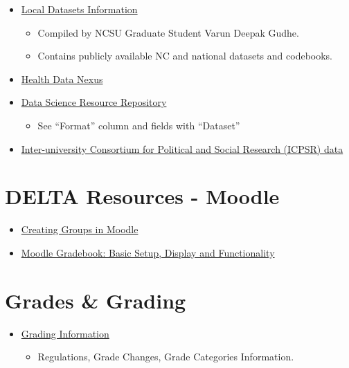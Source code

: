 \documentclass[
  letterpaper,
  DIV=11,
  numbers=noendperiod]{scrreprt}
\providecommand{\tightlist}{%
  \setlength{\itemsep}{0pt}\setlength{\parskip}{0pt}}
\begin{document}
\begin{itemize}
\tightlist
\item
  \href{https://github.com/varundeepakgudhe/Data_Science_Academy}{Local
  Datasets Information}

  \begin{itemize}
  \tightlist
  \item
    Compiled by NCSU Graduate Student Varun Deepak Gudhe.
  \item
    Contains publicly available NC and national datasets and codebooks.
  \end{itemize}
\item
  \href{https://healthdatanexus.ai/content/}{Health Data Nexus}
\item
  \href{https://airtable.com/appGQDiyvo3P6gMPy/shr613n80hMkXuvsr/tblP48JMBeQDDNe2H/viwMiy3v8wu2R8SX5}{Data
  Science Resource Repository}

  \begin{itemize}
  \tightlist
  \item
    See ``Format'' column and fields with ``Dataset''
  \end{itemize}
\item
  \href{https://www.icpsr.umich.edu/web/pages/ICPSR/index.html}{Inter-university
  Consortium for Political and Social Research (ICPSR) data}
\end{itemize}

\section{DELTA Resources - Moodle}\label{delta-resources---moodle}

\begin{itemize}
\tightlist
\item
  \href{https://ncsu.service-now.com/kb_view.do?sysparm_article=KB0020552}{Creating
  Groups in Moodle}
\item
  \href{https://teaching-resources.delta.ncsu.edu/moodle-gradebook/\#moodle}{Moodle
  Gradebook: Basic Setup, Display and Functionality}
\end{itemize}

\section{Grades \& Grading}\label{grades-grading}

\begin{itemize}
\tightlist
\item
  \href{https://registrar.ncsu.edu/facultygradinginfo/}{Grading
  Information}

  \begin{itemize}
  \tightlist
  \item
    Regulations, Grade Changes, Grade Categories Information.
  \end{itemize}
\end{itemize}
\end{document}

